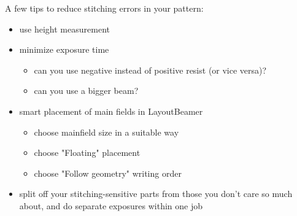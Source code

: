 A few tips to reduce stitching errors in your pattern:
\begin{itemize}
	\item use height measurement
	\item minimize exposure time
		\begin{itemize}
		\item can you use negative instead of positive resist (or vice versa)?
		\item can you use a bigger beam?
		\end{itemize}
	\item smart placement of main fields in LayoutBeamer
		\begin{itemize}
		\item choose mainfield size in a suitable way
		\item choose "Floating" placement
		\item choose "Follow geometry" writing order
	\end{itemize}
	\item split off your stitching-sensitive parts from those you don't care so much about, and do separate exposures within one job
\end{itemize}



